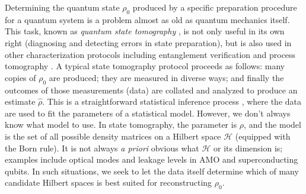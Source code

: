 \documentclass[aps,pra, twocolumn]{revtex4-1}
\newcommand{\cH}{\mathcal{H}}
\newcommand{\rhohat}{\hat{\rho}}
\begin{document}
Determining the quantum state $\rho_{0}$ produced by a specific preparation procedure for a quantum system is a problem almost as old as quantum mechanics itself. This task, known as \emph{quantum state tomography} \cite{Paris2004}, is not only useful in its own right (diagnosing and detecting errors in state preparation), but is also used in other characterization protocols including entanglement verification \cite{Steffen2006, Blume-Kohout2010c, VanEnk2007} and process tomography \cite{Anis2012}. A typical state tomography protocol proceeds as follows: many copies of $\rho_{0}$ are produced; they are measured in diverse ways; and finally the outcomes of those measurements (data) are collated and analyzed to produce an estimate $\rhohat$.  This is a straightforward statistical inference process \cite{Reid2015, Wasserman2004}, where the data are used to fit the parameters of a statistical model.  However, we don't always know what model to use.  In state tomography, the parameter is $\rho$, and the model is the set of all possible density matrices on a Hilbert space $\cH$ (equipped with the Born rule). It is not always \emph{a priori} obvious what $\cH$ or its dimension is; examples include optical modes \cite{Altepeter2005, Bertrand1987, Lvovsky2009, Breitenbach1997, Leonhardt1995} and leakage levels in AMO and superconducting \cite{Motzoi2009, Fazio1999} qubits. In such situations, we seek to let the data itself determine which of many candidate Hilbert spaces is best suited for reconstructing $\rho_{0}$.
\end{document}
